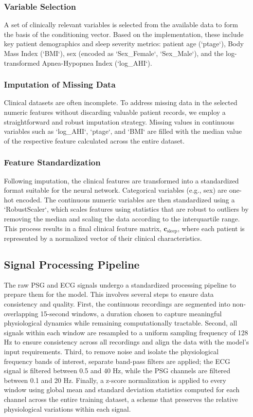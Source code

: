 \documentclass[11pt,en]{elegantpaper}
\begin{document}
\subsubsection{Variable Selection}
A set of clinically relevant variables is selected from the available data to form the basis of the conditioning vector. Based on the implementation, these include key patient demographics and sleep severity metrics: patient age (`ptage`), Body Mass Index (`BMI`), sex (encoded as `Sex_Female`, `Sex_Male`), and the log-transformed Apnea-Hypopnea Index (`log_AHI`).

\subsubsection{Imputation of Missing Data}
Clinical datasets are often incomplete. To address missing data in the selected numeric features without discarding valuable patient records, we employ a straightforward and robust imputation strategy. Missing values in continuous variables such as `log_AHI`, `ptage`, and `BMI` are filled with the median value of the respective feature calculated across the entire dataset.

\subsubsection{Feature Standardization}
Following imputation, the clinical features are transformed into a standardized format suitable for the neural network. Categorical variables (e.g., sex) are one-hot encoded. The continuous numeric variables are then standardized using a `RobustScaler`, which scales features using statistics that are robust to outliers by removing the median and scaling the data according to the interquartile range. This process results in a final clinical feature matrix, $\mathbf{c}_{\text{sleep}}$, where each patient is represented by a normalized vector of their clinical characteristics.

\subsection{Signal Processing Pipeline}
The raw PSG and ECG signals undergo a standardized processing pipeline to prepare them for the model. This involves several steps to ensure data consistency and quality. First, the continuous recordings are segmented into non-overlapping 15-second windows, a duration chosen to capture meaningful physiological dynamics while remaining computationally tractable. Second, all signals within each window are resampled to a uniform sampling frequency of 128 Hz to ensure consistency across all recordings and align the data with the model's input requirements. Third, to remove noise and isolate the physiological frequency bands of interest, separate band-pass filters are applied; the ECG signal is filtered between 0.5 and 40 Hz, while the PSG channels are filtered between 0.1 and 20 Hz. Finally, a z-score normalization is applied to every window using global mean and standard deviation statistics computed for each channel across the entire training dataset, a scheme that preserves the relative physiological variations within each signal.
\end{document}
